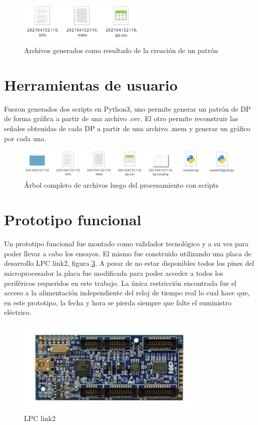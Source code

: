 \begin{figure}[ht]
	\centering
	\includegraphics[width=60mm]{./Figures/firmFiles.png}
	\caption{Archivos generados como resultado de la creación de un patrón}
	\label{fig:firmFiles}
\end{figure}


\section{Herramientas de usuario}

Fueron generados dos scripts en Python3, uno permite generar un patrón de DP de forma gráfica a partir de una archivo .csv. El otro permite reconstruir las señales obtenidas de cada DP a partir de una archivo .mem y generar un gráfico por cada una.

\begin{figure}[ht]
	\centering
	\includegraphics[width=140mm]{./Figures/firmAllFiles.png}
	\caption{Árbol completo de archivos luego del procesamiento con scripts}
	\label{fig:firmAllFiles}
\end{figure}

\section{Prototipo funcional}

Un prototipo funcional fue montado como validador tecnológico y a su vez para poder llevar a cabo los ensayos. El mismo fue construido utilizando una placa de desarrollo LPC link2, figura \ref{fig:hardLPC}. A pesar de no estar disponibles todos los pines del microprocesador la placa fue modificada para poder acceder a todos los periféricos requeridos en este trabajo. La única restricción encontrada fue el acceso a la alimentación independiente del reloj de tiempo real lo cual hace que, en este prototipo, la fecha y hora se pierda siempre que falte el suministro eléctrico. 

\begin{figure}[ht]
	\centering
	\includegraphics[width=90mm]{./Figures/hardLPC.png}
	\caption{LPC link2}
	\label{fig:hardLPC}
\end{figure}

